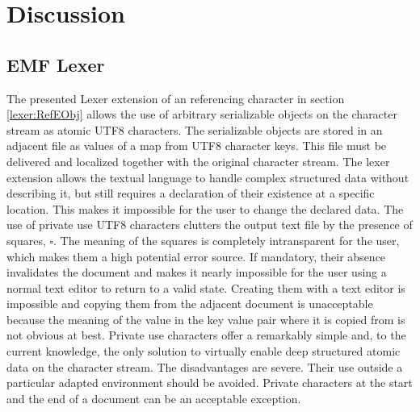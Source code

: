 \chapter{Discussion} \label{cha:discussion}
%
\section{EMF Lexer} \label{sec:EMFLexer} The presented Lexer extension of an referencing character in section \ref{lexer:RefEObj} allows the use of arbitrary serializable objects on the character stream as atomic UTF8 characters. The serializable objects are stored in an adjacent file as values of a map from UTF8 character keys. This file must be delivered and localized together with the original character stream. The lexer extension allows the textual language to handle complex structured data without describing it, but still requires a declaration of their existence at a specific location. This makes it impossible for the user to change the declared data. The use of private use UTF8 characters clutters the output text file by the presence of squares, $\square$. The meaning of the squares is completely intransparent for the user, which makes them a high potential error source. If mandatory, their absence invalidates the document and makes it nearly impossible for the user using a normal text editor to return to a valid state. Creating them with a text editor is impossible and copying them from the adjacent document is unacceptable because the meaning of the value in the key value pair where it is copied from is not obvious at best. Private use characters offer a remarkably simple and, to the current knowledge, the only solution to virtually enable deep structured atomic data on the character stream. The disadvantages are severe. Their use outside a particular adapted environment should be avoided. Private characters at the start and the end of a document can be an acceptable exception. 


